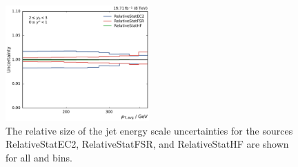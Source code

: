 \begin{figure}[htbp]
    \includegraphics[width=0.49\textwidth]{figures/measurement/jec_relunc_4_yb2ys0.pdf}
    \caption[Split-up of JEC sources: Part V]{The relative size of the jet energy scale
             uncertainties for the sources RelativeStatEC2, RelativeStatFSR, and
             RelativeStatHF are shown for all \ystar and \yboost bins.}
    \label{fig:jec_relunc_4}
\end{figure}

